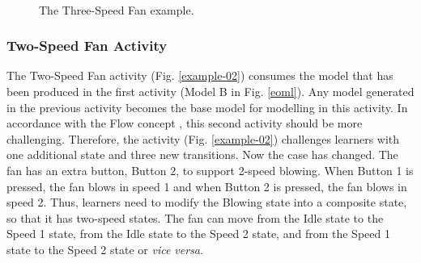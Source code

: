 \documentclass[conference]{IEEEtran}
\begin{document}
\begin{figure}[!t]
    \centering
    \\
	\caption{The Three-Speed Fan example.}
    \label{example-03}
\end{figure}

\subsubsection{Two-Speed Fan Activity}
The Two-Speed Fan activity (Fig. \ref{example-02}) consumes the model that has been produced in the first activity (Model B in Fig. \ref{eoml}). Any model generated in the previous activity becomes the base model for modelling in this activity. In accordance with the Flow concept \cite{csikszentmihalyi2014toward}, this second activity should be more challenging. Therefore, the activity (Fig. \ref{example-02}) challenges learners with one additional state and three new transitions. Now the case has changed. The fan has an extra button, Button 2, to support 2-speed blowing. When Button 1 is pressed, the fan blows in speed 1 and when Button 2 is pressed, the fan blows in speed 2. Thus, learners need to modify the Blowing state into a composite state, so that it has two-speed states. The fan can move from the Idle state to the Speed 1 state, from the Idle state to the Speed 2 state, and from the Speed 1 state to the Speed 2 state or \textit{vice versa}.
\end{document}
